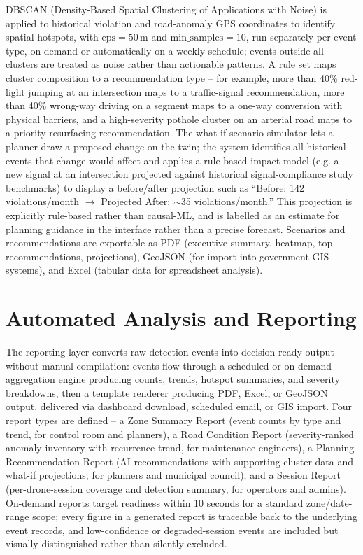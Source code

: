 \documentclass[conference]{IEEEtran}
\begin{document}
DBSCAN (Density-Based Spatial Clustering of Applications with Noise) is applied to historical violation and road-anomaly GPS coordinates to identify spatial hotspots, with $\text{eps} = 50$\,m and $\text{min\_samples} = 10$, run separately per event type, on demand or automatically on a weekly schedule; events outside all clusters are treated as noise rather than actionable patterns. A rule set maps cluster composition to a recommendation type -- for example, more than 40\% red-light jumping at an intersection maps to a traffic-signal recommendation, more than 40\% wrong-way driving on a segment maps to a one-way conversion with physical barriers, and a high-severity pothole cluster on an arterial road maps to a priority-resurfacing recommendation. The what-if scenario simulator lets a planner draw a proposed change on the twin; the system identifies all historical events that change would affect and applies a rule-based impact model (e.g. a new signal at an intersection projected against historical signal-compliance study benchmarks) to display a before/after projection such as ``Before: 142 violations/month $\to$ Projected After: $\sim$35 violations/month.'' This projection is explicitly rule-based rather than causal-ML, and is labelled as an estimate for planning guidance in the interface rather than a precise forecast. Scenarios and recommendations are exportable as PDF (executive summary, heatmap, top recommendations, projections), GeoJSON (for import into government GIS systems), and Excel (tabular data for spreadsheet analysis).

\section{Automated Analysis and Reporting}
\label{sec:reporting}

The reporting layer converts raw detection events into decision-ready output without manual compilation: events flow through a scheduled or on-demand aggregation engine producing counts, trends, hotspot summaries, and severity breakdowns, then a template renderer producing PDF, Excel, or GeoJSON output, delivered via dashboard download, scheduled email, or GIS import. Four report types are defined -- a Zone Summary Report (event counts by type and trend, for control room and planners), a Road Condition Report (severity-ranked anomaly inventory with recurrence trend, for maintenance engineers), a Planning Recommendation Report (AI recommendations with supporting cluster data and what-if projections, for planners and municipal council), and a Session Report (per-drone-session coverage and detection summary, for operators and admins). On-demand reports target readiness within 10 seconds for a standard zone/date-range scope; every figure in a generated report is traceable back to the underlying event records, and low-confidence or degraded-session events are included but visually distinguished rather than silently excluded.
\end{document}
